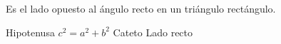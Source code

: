 
\question Es el lado opuesto al ángulo recto en un triángulo rectángulo.

  \begin{oneparchoices}
    \CorrectChoice Hipotenusa
    \choice $c^2 = a^2 + b^2$
    \choice Cateto
    \choice Lado recto
  \end{oneparchoices}
  \answerline[A]
